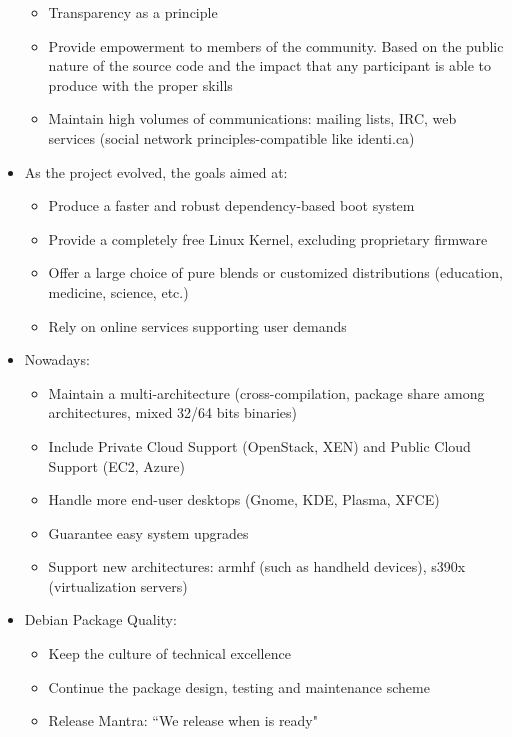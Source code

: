 \documentclass[11pt]{article} %
\begin{document}
\begin{itemize}
	  	\begin{itemize}
	  	  \item Transparency as a principle
	  	  \item Provide empowerment to members of the community. Based on the public nature of the source code and the impact that any participant is able to produce with the proper skills
	  	  \item Maintain high volumes of communications: mailing lists, IRC, web services (social network principles-compatible like identi.ca)
	  	\end{itemize}
  	  \item As the project evolved, the goals aimed at:
	  	\begin{itemize}
	  	  \item Produce a faster and robust dependency-based boot system
	  	  \item Provide a completely free Linux Kernel, excluding proprietary firmware
	  	  \item Offer a large choice of pure blends or customized distributions (education, medicine, science, etc.)
	  	  \item Rely on online services supporting user demands
	  	\end{itemize}
  	  \item Nowadays:
	  	\begin{itemize}
	  	  \item Maintain a multi-architecture (cross-compilation, package share among architectures, mixed 32/64 bits binaries)
	  	  \item Include Private Cloud Support (OpenStack, XEN) and Public Cloud Support (EC2, Azure)
	  	  \item Handle more end-user desktops (Gnome, KDE, Plasma, XFCE)
	  	  \item Guarantee easy system upgrades
	  	  \item Support new architectures: armhf (such as handheld devices), s390x (virtualization servers)
	  	\end{itemize}
  	  \item Debian Package Quality:
	  	\begin{itemize}
	  	  \item Keep the culture of technical excellence
	  	  \item Continue the package design, testing and maintenance scheme
	  	  \item Release Mantra: ``We release when is ready"
	  	\end{itemize}  	  

\end{itemize}
\end{document}
